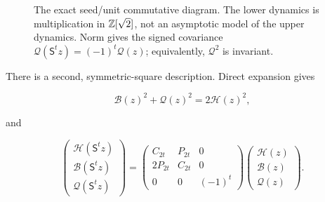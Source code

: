\begin{figure}[H]
\centering
{}
\caption{The exact seed/unit commutative diagram. The lower dynamics is
multiplication in $\mathbb{Z}[\sqrt2]$, not an asymptotic model of the upper
dynamics. Norm gives the signed covariance $\mathcal Q(\mathsf S^tz)=
(-1)^t\mathcal Q(z)$; equivalently, $\mathcal Q^2$ is invariant.}
\label{fig:seed-semiconjugacy}
\end{figure}

There is a second, symmetric-square description. Direct expansion gives

\begin{equation}
 \mathcal B(z)^2+\mathcal Q(z)^2=2\mathcal H(z)^2,
 \label{eq:lorentz-cone}
\end{equation}

and

\begin{equation}
 \begin{pmatrix}
  \mathcal H(\mathsf S^tz)\\
  \mathcal B(\mathsf S^tz)\\
  \mathcal Q(\mathsf S^tz)
 \end{pmatrix}
 =
 \begin{pmatrix}
  C_{2t}&P_{2t}&0\\
  2P_{2t}&C_{2t}&0\\
  0&0&(-1)^t
 \end{pmatrix}
 \begin{pmatrix}
  \mathcal H(z)\\
  \mathcal B(z)\\
  \mathcal Q(z)
 \end{pmatrix}.
 \label{eq:lorentz-action}
\end{equation}

